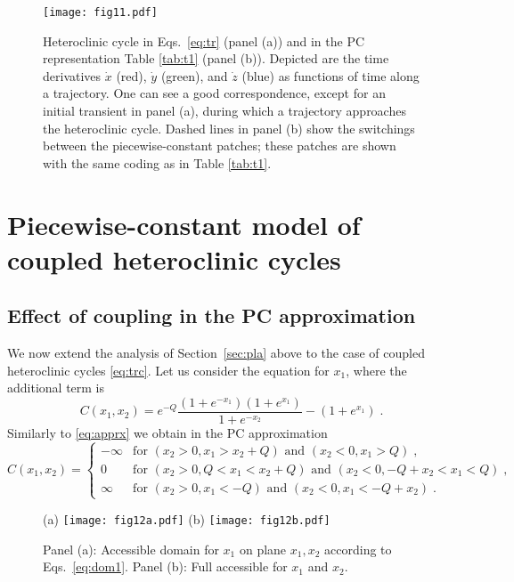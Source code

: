 \documentclass[3p,number,review,sort&compress]{elsarticle}
\begin{document}
\begin{figure}[!htb]
\centering
\texttt{[image: fig11.pdf]}
\caption{Heteroclinic cycle in Eqs.~\eqref{eq:tr} (panel (a)) and in the 
PC representation Table \ref{tab:t1} (panel (b)). Depicted are the time derivatives $\dot x$ (red), $\dot y$ (green), and $\dot z$ (blue)
as functions of time along a trajectory. One can see a good correspondence, except
for an initial transient in panel (a), during which a trajectory approaches
the heteroclinic cycle. Dashed lines in panel (b) show the switchings between the piecewise-constant patches; these patches are shown with the same coding as in Table \ref{tab:t1}.
}
\label{fig:2c}
\end{figure}

\section{Piecewise-constant model of coupled heteroclinic cycles}
\label{sec:pc}
\subsection{Effect of coupling in the PC approximation}

We now extend the analysis of Section~\ref{sec:pla} above to the case
of coupled heteroclinic cycles \eqref{eq:trc}. Let us consider the equation for $x_1$,
where the additional term is 
\[
C(x_1,x_2)=e^{-Q}\frac{(1+e^{-x_1})(1+e^{x_1})}{1+e^{-x_2}}-(1+e^{x_1})\;.
\]
Similarly to \eqref{eq:apprx} we obtain in the PC approximation
\begin{equation}
C(x_1,x_2)=\begin{cases} -\infty & \text{for } (x_2>0,x_1>x_2+Q) \text{ and }
(x_2<0, x_1>Q)\;,\\
0 & \text{for } (x_2>0,Q<x_1<x_2+Q) \text{ and }
(x_2<0, -Q+x_2<x_1<Q)\;,\\
\infty & \text{for } (x_2>0,x_1<-Q) \text{ and }
(x_2<0, x_1<-Q+x_2)\;.
\end{cases}
\label{eq:dom1}
\end{equation}


\begin{figure}[!htb]
\centering
(a) \texttt{[image: fig12a.pdf]}\qquad
(b) \texttt{[image: fig12b.pdf]}
\caption{Panel (a): Accessible domain for $x_1$ on plane $x_1,x_2$ according 
to Eqs.~\eqref{eq:dom1}. Panel (b): Full accessible for $x_1$ and $x_2$.} 
\label{fig:domc}
\end{figure}
\end{document}
